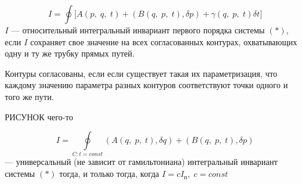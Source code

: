 \begin{df}
	\[
		I = \oint\big[A(p,\; q,\; t) + (B(q,\; p, \; t), \delta p) + \gamma(q,\; p, \; t)\delta t\big]
	\]
	$I$ --- относительный интегральный инвариант первого порядка системы $(*)$, если $I$ сохраняет свое значение на всех согласованных контурах, охватывающих одну и ту же трубку прямых путей.
\end{df}
\begin{df}
	Контуры согласованы, если если существует такая их параметризация, что каждому значению параметра разных контуров соответствуют точки одного и того же пути.
\end{df}
РИСУНОК чего-то

\begin{teo}
	\[ 
		I = \oint\limits_{C: t = const} (A(q,\; p,\; t), \delta q) + (B(q,\; p, \; t), \delta p)
	\] 
	--- универсальный (не зависит от гамильтониана) интегральный инвариант системы $(*)$ тогда, и только тогда, когда $I = cI_\text{п},\; c = const$
\end{teo}
